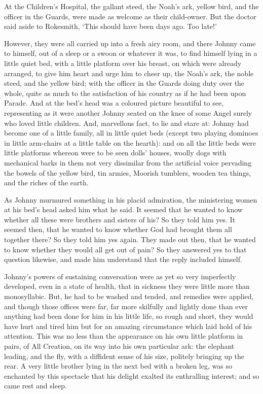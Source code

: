 At the Children’s Hospital, the gallant steed, the Noah’s ark, yellow
bird, and the officer in the Guards, were made as welcome as their
child-owner. But the doctor said aside to Rokesmith, ‘This should have
been days ago. Too late!’

However, they were all carried up into a fresh airy room, and there
Johnny came to himself, out of a sleep or a swoon or whatever it was,
to find himself lying in a little quiet bed, with a little platform over
his breast, on which were already arranged, to give him heart and urge
him to cheer up, the Noah’s ark, the noble steed, and the yellow bird;
with the officer in the Guards doing duty over the whole, quite as much
to the satisfaction of his country as if he had been upon Parade. And at
the bed’s head was a coloured picture beautiful to see, representing as
it were another Johnny seated on the knee of some Angel surely who loved
little children. And, marvellous fact, to lie and stare at: Johnny had
become one of a little family, all in little quiet beds (except two
playing dominoes in little arm-chairs at a little table on the hearth):
and on all the little beds were little platforms whereon were to be
seen dolls’ houses, woolly dogs with mechanical barks in them not very
dissimilar from the artificial voice pervading the bowels of the yellow
bird, tin armies, Moorish tumblers, wooden tea things, and the riches of
the earth.

As Johnny murmured something in his placid admiration, the ministering
women at his bed’s head asked him what he said. It seemed that he wanted
to know whether all these were brothers and sisters of his? So they told
him yes. It seemed then, that he wanted to know whether God had brought
them all together there? So they told him yes again. They made out then,
that he wanted to know whether they would all get out of pain? So they
answered yes to that question likewise, and made him understand that the
reply included himself.

Johnny’s powers of sustaining conversation were as yet so very
imperfectly developed, even in a state of health, that in sickness they
were little more than monosyllabic. But, he had to be washed and tended,
and remedies were applied, and though those offices were far, far more
skilfully and lightly done than ever anything had been done for him in
his little life, so rough and short, they would have hurt and tired him
but for an amazing circumstance which laid hold of his attention. This
was no less than the appearance on his own little platform in pairs,
of All Creation, on its way into his own particular ark: the elephant
leading, and the fly, with a diffident sense of his size, politely
bringing up the rear. A very little brother lying in the next bed with a
broken leg, was so enchanted by this spectacle that his delight exalted
its enthralling interest; and so came rest and sleep.

